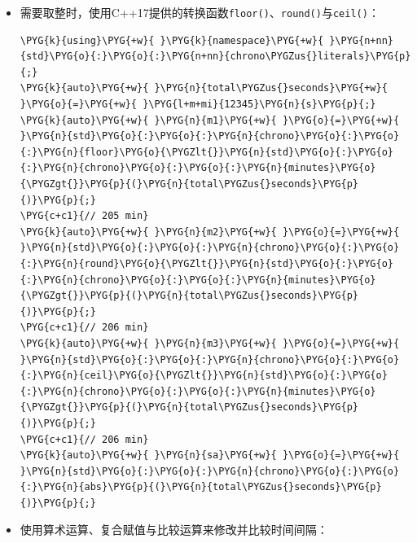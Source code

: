 \begin{itemize}

\item 需要取整时，使用C++17提供的转换函数\texttt{floor()}、\texttt{round()}与\texttt{ceil()}：



\begin{codeblockbg}
\begin{Verbatim}[commandchars=\\\{\},breaklines=true,breakanywhere=true,fontsize=\codefont,xleftmargin=17bp]
\PYG{k}{using}\PYG{+w}{ }\PYG{k}{namespace}\PYG{+w}{ }\PYG{n+nn}{std}\PYG{o}{:}\PYG{o}{:}\PYG{n+nn}{chrono\PYGZus{}literals}\PYG{p}{;}
\PYG{k}{auto}\PYG{+w}{ }\PYG{n}{total\PYGZus{}seconds}\PYG{+w}{ }\PYG{o}{=}\PYG{+w}{ }\PYG{l+m+mi}{12345}\PYG{n}{s}\PYG{p}{;}
\PYG{k}{auto}\PYG{+w}{ }\PYG{n}{m1}\PYG{+w}{ }\PYG{o}{=}\PYG{+w}{ }\PYG{n}{std}\PYG{o}{:}\PYG{o}{:}\PYG{n}{chrono}\PYG{o}{:}\PYG{o}{:}\PYG{n}{floor}\PYG{o}{\PYGZlt{}}\PYG{n}{std}\PYG{o}{:}\PYG{o}{:}\PYG{n}{chrono}\PYG{o}{:}\PYG{o}{:}\PYG{n}{minutes}\PYG{o}{\PYGZgt{}}\PYG{p}{(}\PYG{n}{total\PYGZus{}seconds}\PYG{p}{)}\PYG{p}{;}
\PYG{c+c1}{// 205 min}
\PYG{k}{auto}\PYG{+w}{ }\PYG{n}{m2}\PYG{+w}{ }\PYG{o}{=}\PYG{+w}{ }\PYG{n}{std}\PYG{o}{:}\PYG{o}{:}\PYG{n}{chrono}\PYG{o}{:}\PYG{o}{:}\PYG{n}{round}\PYG{o}{\PYGZlt{}}\PYG{n}{std}\PYG{o}{:}\PYG{o}{:}\PYG{n}{chrono}\PYG{o}{:}\PYG{o}{:}\PYG{n}{minutes}\PYG{o}{\PYGZgt{}}\PYG{p}{(}\PYG{n}{total\PYGZus{}seconds}\PYG{p}{)}\PYG{p}{;}
\PYG{c+c1}{// 206 min}
\PYG{k}{auto}\PYG{+w}{ }\PYG{n}{m3}\PYG{+w}{ }\PYG{o}{=}\PYG{+w}{ }\PYG{n}{std}\PYG{o}{:}\PYG{o}{:}\PYG{n}{chrono}\PYG{o}{:}\PYG{o}{:}\PYG{n}{ceil}\PYG{o}{\PYGZlt{}}\PYG{n}{std}\PYG{o}{:}\PYG{o}{:}\PYG{n}{chrono}\PYG{o}{:}\PYG{o}{:}\PYG{n}{minutes}\PYG{o}{\PYGZgt{}}\PYG{p}{(}\PYG{n}{total\PYGZus{}seconds}\PYG{p}{)}\PYG{p}{;}
\PYG{c+c1}{// 206 min}
\PYG{k}{auto}\PYG{+w}{ }\PYG{n}{sa}\PYG{+w}{ }\PYG{o}{=}\PYG{+w}{ }\PYG{n}{std}\PYG{o}{:}\PYG{o}{:}\PYG{n}{chrono}\PYG{o}{:}\PYG{o}{:}\PYG{n}{abs}\PYG{p}{(}\PYG{n}{total\PYGZus{}seconds}\PYG{p}{)}\PYG{p}{;}
\end{Verbatim}
\end{codeblockbg}



\item 使用算术运算、复合赋值与比较运算来修改并比较时间间隔：




\end{itemize}
